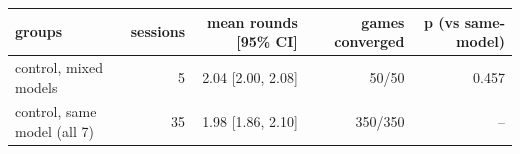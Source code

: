 \begin{tabular}{lrrrr}
\toprule
\textbf{groups} & \textbf{sessions} & \textbf{mean rounds [95\% CI]} & \textbf{games converged} & \textbf{p (vs same-model)} \\
\midrule
control, mixed models & 5 & 2.04 [2.00, 2.08] & 50/50 & 0.457 \\
control, same model (all 7) & 35 & 1.98 [1.86, 2.10] & 350/350 & -- \\
\bottomrule
\end{tabular}
